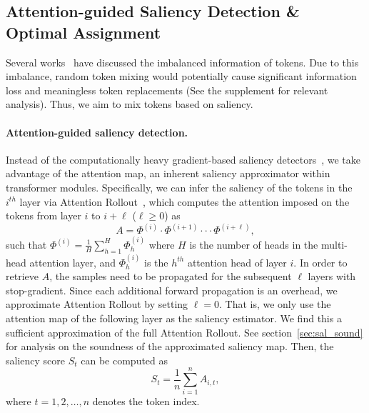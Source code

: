 \documentclass{article}
\begin{document}
%
 
\subsection{Attention-guided Saliency Detection \& Optimal Assignment}
Several works~\cite{heo2021rethinking, rao2021dynamicvit, roh2021sparse, wang2021pnp} have discussed the imbalanced information of tokens.
Due to this imbalance, random token mixing would potentially cause significant information loss and meaningless token replacements (See the supplement for relevant analysis).
Thus, we aim to mix tokens based on saliency.

\vspace{-2mm}
\paragraph{Attention-guided saliency detection.} 
Instead of the computationally heavy gradient-based saliency detectors~\cite{kim2020puzzle, kim2021co}, we take advantage of the attention map, an inherent saliency approximator within transformer modules.
Specifically, we can infer the saliency of the tokens in the $i^{th}$ layer via Attention Rollout~\cite{abnar2020quantifying}, which computes the attention imposed on the tokens from layer $i$ to $i + \ell$ ($\ell \geq 0$) as
\begin{equation}
\label{eq:rollout}
    A = \Phi^{(i)} \cdot \Phi^{(i+1)} \cdot \cdot \cdot \Phi^{(i+\ell)},
\end{equation}
such that $\Phi^{(i)} = \frac{1}{H}\sum_{h=1}^H \Phi^{(i)}_h$ where $H$ is the number of heads in the multi-head attention layer, and $\Phi^{(i)}_h$ is the $h^{th}$ attention head of layer $i$.
In order to retrieve $A$, the samples need to be propagated for the subsequent $\ell$ layers with stop-gradient.
Since each additional forward propagation is an overhead, we approximate Attention Rollout by setting $\ell = 0$.
That is, we only use the attention map of the following layer as the saliency estimator. 
We find this a sufficient approximation of the full Attention Rollout.
See section~\ref{sec:sal_sound} for analysis on the soundness of the approximated saliency map.
Then, the saliency score $S_t$ can be computed as
\begin{equation}
\label{eq:saliencyscore}
    S_t = \displaystyle \frac{1}{n} \sum_{i=1}^n A_{i, t},
\end{equation}
where $t = 1, 2, \ldots, n$ denotes the token index.
\end{document}
